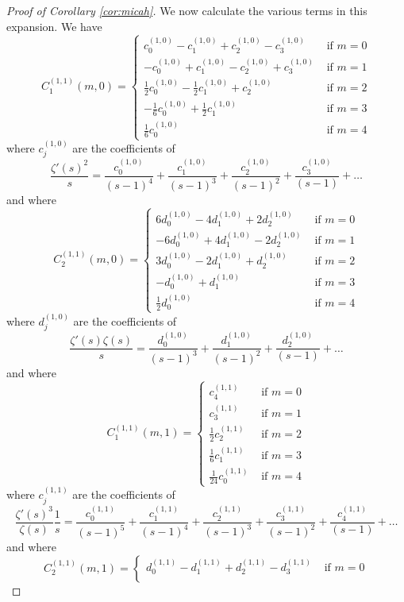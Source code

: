 \documentclass[10pt,a4paper]{amsart}
\begin{document}
\begin{proof}[Proof of Corollary \ref{cor:micah}]
We now calculate the various terms in this expansion. We have
\[
C_1^{(1,1)}(m,0) = 
\begin{cases}
     c^{(1,0)}_0-c^{(1,0)}_1+c^{(1,0)}_2-c^{(1,0)}_3 & \text{ if } m=0 \\[1.5ex]
    -c^{(1,0)}_0+c^{(1,0)}_1-c^{(1,0)}_2+c^{(1,0)}_3 & \text{ if } m=1 \\[1.5ex]
   \frac{1}{2} c^{(1,0)}_0- \frac{1}{2}  c^{(1,0)}_1 +c^{(1,0)}_2 & \text{ if } m=2 \\[1.5ex]
    -\frac{1}{6} c^{(1,0)}_0 +\frac{1}{2} c^{(1,0)}_1 & \text{ if } m=3\\[1.5ex]
    \frac{1}{6} c^{(1,0)}_0 & \text{ if } m=4
\end{cases}
\]
where $c^{(1,0)}_j$ are the coefficients of
\[
\frac{\zeta'(s)^2}{s} = \frac{c^{(1,0)}_0}{(s-1)^4} + \frac{c^{(1,0)}_1}{(s-1)^3} + \frac{c^{(1,0)}_2}{(s-1)^2} + \frac{c^{(1,0)}_3}{(s-1)} + \dots
\]
and where
\[
C_2^{(1,1)}(m,0) = 
\begin{cases}
6 d^{(1,0)}_0 -4 d^{(1,0)}_1 + 2d^{(1,0)}_2 & \text{ if } m=0 \\[1.5ex]
-6 d^{(1,0)}_0 + 4d^{(1,0)}_1 - 2d^{(1,0)}_2 & \text{ if } m=1 \\[1.5ex]
3 d^{(1,0)}_0 -2d^{(1,0)}_1 +d^{(1,0)}_2& \text{ if } m=2 \\[1.5ex]
-d^{(1,0)}_0 + d^{(1,0)}_1& \text{ if } m=3\\[1.5ex]
\frac{1}{2} d^{(1,0)}_0 & \text{ if } m=4
\end{cases}
\]
where $d^{(1,0)}_j$ are the coefficients of
\[
\frac{\zeta'(s) \zeta(s)}{s} = \frac{d^{(1,0)}_0}{(s-1)^3} + \frac{d^{(1,0)}_1}{(s-1)^2} + \frac{d^{(1,0)}_2}{(s-1)} + \dots
\]
and where
\[
C_1^{(1,1)}(m,1) = 
\begin{cases}
c^{(1,1)}_4 & \text{ if } m=0 \\[1.5ex]
c^{(1,1)}_3 & \text{ if } m=1 \\[1.5ex]
\frac{1}{2} c^{(1,1)}_2 & \text{ if } m=2 \\[1.5ex]
\frac{1}{6} c^{(1,1)}_1 & \text{ if } m=3\\[1.5ex]
\frac{1}{24} c^{(1,1)}_0 & \text{ if } m=4
\end{cases}
\]
where $c^{(1,1)}_j$ are the coefficients of
\[
\frac{\zeta'(s)^3}{\zeta(s)} \frac{1}{ s} = \frac{c^{(1,1)}_0}{(s-1)^5} + \frac{c^{(1,1)}_1}{(s-1)^4} + \frac{c^{(1,1)}_2}{(s-1)^3} + \frac{c^{(1,1)}_3}{(s-1)^2} + \frac{c^{(1,1)}_4}{(s-1)} + \dots
\]
and where
\[
C_2^{(1,1)}(m,1) = 
\begin{cases}
d^{(1,1)}_0 -d^{(1,1)}_1 +d^{(1,1)}_2 -d^{(1,1)}_3  & \text{ if } m=0 \\[1.5ex]

\end{cases}\]
\end{proof}
\end{document}
